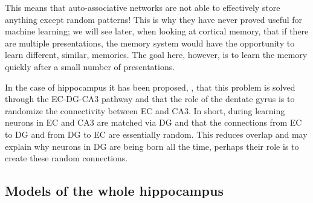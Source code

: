 \documentclass[11pt,a4paper]{scrartcl}
\begin{document}
This means that auto-associative networks are not able to effectively
store anything except random patterns! This is why they have never
proved useful for machine learning; we will see later, when looking at cortical memory, that if there are multiple presentations, the memory system would have the opportunity to learn different, similar, memories. The goal here, however, is to learn the memory quickly after a small number of presentations.

In the case of hippocampus it has been proposed,
\cite{OReillyMcClelland1994a}, that this problem is solved through the
EC-DG-CA3 pathway and that the role of the dentate gyrus is to
randomize the connectivity between EC and CA3. In short, during
learning neurons in EC and CA3 are matched via DG and that the
connections from EC to DG and from DG to EC are essentially
random. This reduces overlap and may explain why neurons in DG are
being born all the time, perhaps their role is to create these random
connections.

\subsection*{Models of the whole hippocampus}
\end{document}
